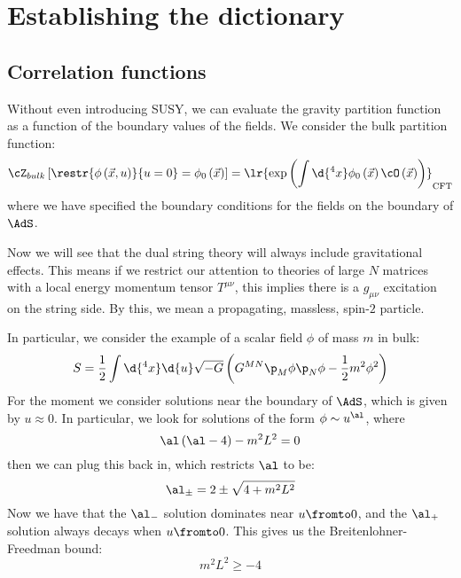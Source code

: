 \documentclass{booc}
\begin{document}
\section{Establishing the dictionary}

\subsection{Correlation functions}

Without even introducing SUSY, we
can evaluate the gravity partition function as a function of the boundary values
of the fields. We consider the bulk partition function:
\begin{equation}
\cZ_{bulk}\left[ \restr{\phi\left( \vec{x} , u \right)}{u = 0} = 
\phi_0\left( \vec{x} \right) \right] = \lr{\exp\left( \int \d{^4 x} \phi_0\left( \vec{x}\right)
\cO\left( \vec{x} \right) \right)}_{\text{CFT}}
\end{equation}
where we have specified the boundary conditions for the fields on the boundary of $\AdS$.

Now we will see that the dual string theory will always include gravitational effects. 
This means if we restrict our attention to theories of large $N$ matrices with a local energy
momentum tensor $T^{\mu\nu}$,
this implies there is a $g_{\mu\nu}$ excitation on the string side.
By this, we mean a propagating, massless, spin-$2$ particle.

\begin{exm}
In particular, we consider the example of a scalar field $\phi$ of mass $m$ in bulk:
\begin{equation}
S = \frac{1}{2}
\int \d{^4 x} \d{u} \sqrt{-G}
\left( G^{MN} \p_M \phi \p_N \phi - \frac{1}{2} m^2 \phi^2 \right)
\end{equation}
For the moment we consider solutions near the boundary of $\AdS$, which is given by
$u\approx 0$. In particular, we look for solutions of the form $\phi \sim u^\al$, where
\begin{equation}
\al\left( \al - 4 \right) - m^2 L^2 = 0
\end{equation}
then we can plug this back in, which restricts $\al$ to be:
\begin{equation}
\al_{\pm} = 2 \pm \sqrt{4 + m^2 L^2}
\end{equation}
Now we have that the $\al_-$ solution dominates near $u\fromto 0$, and the 
$\al_+$ solution always decays when $u\fromto 0$. 
This gives us the Breitenlohner-Freedman bound:
\begin{equation}
m^2 L^2 \geq -4
\end{equation}
\end{exm}
\end{document}
